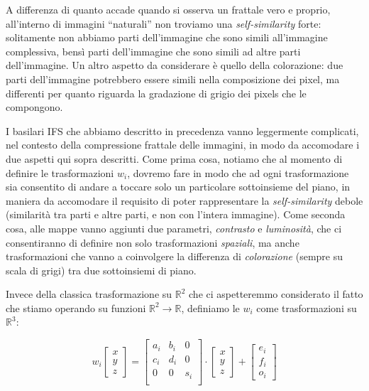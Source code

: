 \documentclass[11pt,a4paper,appendixprefix=true,numbers=noenddot]{scrreprt}
\begin{document}
A differenza di quanto accade quando si osserva un frattale vero e proprio, all'interno di immagini ``naturali'' non troviamo una \emph{self-similarity} forte: solitamente non abbiamo parti dell'immagine che sono simili all'immagine complessiva, bensì parti dell'immagine che sono simili ad altre parti dell'immagine. Un altro aspetto da considerare è quello della colorazione: due parti dell'immagine potrebbero essere simili nella composizione dei pixel, ma differenti per quanto riguarda la gradazione di grigio dei pixels che le compongono. 

I basilari IFS che abbiamo descritto in precedenza vanno leggermente complicati, nel contesto della compressione frattale delle immagini, in modo da accomodare i due aspetti qui sopra descritti. Come prima cosa, notiamo che al momento di definire le trasformazioni $w_i$, dovremo fare in modo che ad ogni trasformazione sia consentito di andare a toccare solo un particolare sottoinsieme del piano, in maniera da accomodare il requisito di poter rappresentare la \emph{self-similarity} debole (similarità tra parti e altre parti, e non con l'intera immagine). Come seconda cosa, alle mappe vanno aggiunti due parametri, \emph{contrasto} e \emph{luminosità}, che ci consentiranno di definire non solo trasformazioni  \emph{spaziali}, ma anche trasformazioni che vanno a coinvolgere la differenza di \emph{colorazione} (sempre su scala di grigi) tra due sottoinsiemi di piano.

Invece della classica trasformazione su $\mathbb{R}^2$ che ci aspetteremmo considerato il fatto che stiamo operando su funzioni $\mathbb{R}^2 \rightarrow \mathbb{R}$, definiamo le $w_i$ come trasformazioni su $\mathbb{R}^3$:

\[
w_i \begin{bmatrix} 
x \\
y \\
z
\end{bmatrix} = \begin{bmatrix}
a_i & b_i & 0 \\
c_i & d_i & 0 \\
0 & 0 & s_i \\
\end{bmatrix} \cdot \begin{bmatrix} 
x \\
y \\
z
\end{bmatrix} + \begin{bmatrix} 
e_i \\
f_i \\
o_i
\end{bmatrix}
\]
\end{document}
